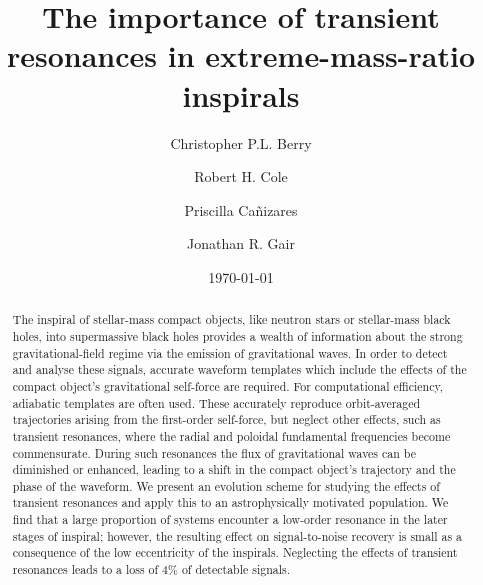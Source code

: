 \documentclass[aps,prd,amsfonts,amssymb,amsmath,nofootinbib,showpacs,superscriptaddress,twocolumn,floatfix]{revtex4-1}
\begin{document}

\title{The importance of transient resonances in extreme-mass-ratio inspirals}

\author{Christopher P.L. Berry}
\author{Robert H. Cole}
\author{Priscilla Ca\~{n}izares}
\author{Jonathan R. Gair}

\date{\today}

\begin{abstract}
The inspiral of stellar-mass compact objects, like neutron stars or stellar-mass black holes, into supermassive black holes provides a wealth of information about the strong gravitational-field regime via the emission of gravitational waves.
In order to detect and analyse these signals, accurate waveform templates which include the effects of the compact object's gravitational self-force are required. For computational efficiency, adiabatic templates are often used. These accurately reproduce orbit-averaged trajectories arising from the first-order self-force, but neglect other effects, such as transient resonances, where the radial and poloidal fundamental frequencies become commensurate.
During such resonances the flux of gravitational waves can be diminished or enhanced, leading to a shift in the compact object's trajectory and the phase of the waveform.
We present an evolution scheme for studying the effects of transient resonances and apply this to an astrophysically motivated population.
We find that a large proportion of systems encounter a low-order resonance in the later stages of inspiral; however, the resulting effect on signal-to-noise recovery is small as a consequence of the low eccentricity of the inspirals. Neglecting the effects of transient resonances leads to a loss of $4\%$ of detectable signals.
\end{abstract}
\end{document}
